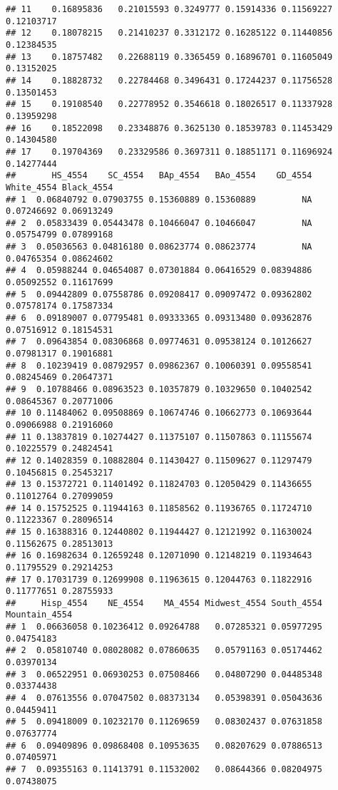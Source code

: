 \documentclass[
]{article}
\begin{document}
\begin{verbatim}
## 11    0.16895836   0.21015593 0.3249777 0.15914336 0.11569227 0.12103717
## 12    0.18078215   0.21410237 0.3312172 0.16285122 0.11440856 0.12384535
## 13    0.18757482   0.22688119 0.3365459 0.16896701 0.11605049 0.13152025
## 14    0.18828732   0.22784468 0.3496431 0.17244237 0.11756528 0.13501453
## 15    0.19108540   0.22778952 0.3546618 0.18026517 0.11337928 0.13959298
## 16    0.18522098   0.23348876 0.3625130 0.18539783 0.11453429 0.14304580
## 17    0.19704369   0.23329586 0.3697311 0.18851171 0.11696924 0.14277444
##       HS_4554    SC_4554   BAp_4554   BAo_4554    GD_4554 White_4554 Black_4554
## 1  0.06840792 0.07903755 0.15360889 0.15360889         NA 0.07246692 0.06913249
## 2  0.05833439 0.05443478 0.10466047 0.10466047         NA 0.05754799 0.07899168
## 3  0.05036563 0.04816180 0.08623774 0.08623774         NA 0.04765354 0.08624602
## 4  0.05988244 0.04654087 0.07301884 0.06416529 0.08394886 0.05092552 0.11617699
## 5  0.09442809 0.07558786 0.09208417 0.09097472 0.09362802 0.07578174 0.17587334
## 6  0.09189007 0.07795481 0.09333365 0.09313480 0.09362876 0.07516912 0.18154531
## 7  0.09643854 0.08306868 0.09774631 0.09538124 0.10126627 0.07981317 0.19016881
## 8  0.10239419 0.08792957 0.09862367 0.10060391 0.09558541 0.08245469 0.20647371
## 9  0.10788466 0.08963523 0.10357879 0.10329650 0.10402542 0.08645367 0.20771006
## 10 0.11484062 0.09508869 0.10674746 0.10662773 0.10693644 0.09066988 0.21916060
## 11 0.13837819 0.10274427 0.11375107 0.11507863 0.11155674 0.10225579 0.24824541
## 12 0.14028359 0.10882804 0.11430427 0.11509627 0.11297479 0.10456815 0.25453217
## 13 0.15372721 0.11401492 0.11824703 0.12050429 0.11436655 0.11012764 0.27099059
## 14 0.15752525 0.11944163 0.11858562 0.11936765 0.11724710 0.11223367 0.28096514
## 15 0.16388316 0.12440802 0.11944427 0.12121992 0.11630024 0.11562675 0.28513013
## 16 0.16982634 0.12659248 0.12071090 0.12148219 0.11934643 0.11795529 0.29214253
## 17 0.17031739 0.12699908 0.11963615 0.12044763 0.11822916 0.11777651 0.28755933
##     Hisp_4554    NE_4554    MA_4554 Midwest_4554 South_4554 Mountain_4554
## 1  0.06636058 0.10236412 0.09264788   0.07285321 0.05977295    0.04754183
## 2  0.05810740 0.08028082 0.07860635   0.05791163 0.05174462    0.03970134
## 3  0.06522951 0.06930253 0.07508466   0.04807290 0.04485348    0.03374438
## 4  0.07613556 0.07047502 0.08373134   0.05398391 0.05043636    0.04459411
## 5  0.09418009 0.10232170 0.11269659   0.08302437 0.07631858    0.07637774
## 6  0.09409896 0.09868408 0.10953635   0.08207629 0.07886513    0.07405971
## 7  0.09355163 0.11413791 0.11532002   0.08644366 0.08204975    0.07438075

\end{verbatim}
\end{document}

